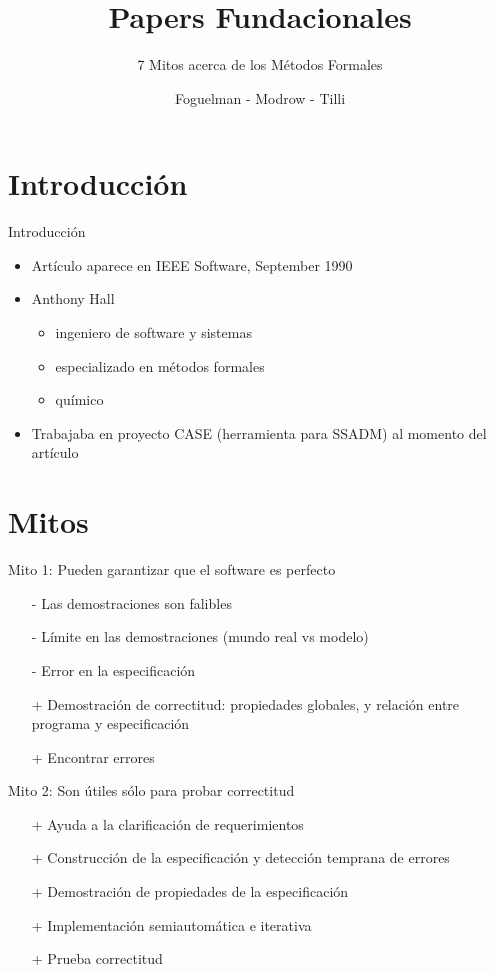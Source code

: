 \documentclass{beamer}
\title{Papers Fundacionales}
\subtitle{7 Mitos acerca de los M\'etodos Formales}
\author{Foguelman - Modrow - Tilli}
\institute{DC - UBA}
\begin{document}
\frame{\titlepage}
\section{Introducci\'on}
\begin{frame}{Introducci\'on}
\begin{itemize}
\item Art\'iculo aparece en IEEE Software, September 1990
\item Anthony Hall 
\begin{itemize}
\item ingeniero de software y sistemas
\item especializado en m\'etodos formales
\item qu\'imico
\end{itemize}
\item Trabajaba en proyecto CASE (herramienta para SSADM) al momento del art\'iculo
\end{itemize}

\end{frame}

\section{Mitos}
\begin{frame}{Mito 1: Pueden garantizar que el software es perfecto }
\begin{itemize}[<+->]
\item[-] Las demostraciones son falibles 
\item[-] L\'imite en las demostraciones (mundo real vs modelo)
\item[-] Error en la especificaci\'on
\item[+] Demostraci\'on de correctitud: propiedades globales, y relaci\'on entre programa y especificaci\'on
\item[+] Encontrar errores
\end{itemize}
\end{frame}

\begin{frame}{Mito 2: Son \'utiles s\'olo para probar correctitud}
\begin{itemize}[<+->]
\item[+] Ayuda a la clarificaci\'on de requerimientos
\item[+] Construcci\'on de la especificaci\'on y detecci\'on temprana de errores
\item[+] Demostraci\'on de propiedades de la especificaci\'on
\item[+] Implementaci\'on semiautom\'atica e iterativa
\item[+] Prueba correctitud
\end{itemize}
\end{frame}
 
\end{document}
